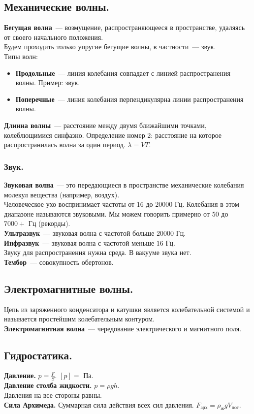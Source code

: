 \documentclass[12pt]{article}
\begin{document}
	\subsection{Механические волны.}
	\textbf{Бегущая волна}~--- возмущение, распространяющееся в пространстве, удаляясь от своего начального положения. \\
	Будем проходить только упругие бегущие волны, в частности~--- звук. \\
	Типы волн:
	\begin{itemize}
		\item \textbf{Продольные}~--- линия колебания совпадает с линией распространения волны. Пример: звук.
		\item \textbf{Поперечные}~--- линия колебания перпендикулярна линии распространения волны.
	\end{itemize}
	\textbf{Длинна волны}~--- расстояние между двумя ближайшими точками, колеблющимися синфазно. Определение номер $2$: расстояние на которое распространилась волна за один период. $\lambda = VT$.
	\subsubsection{Звук.}
	\textbf{Звуковая волна}~--- это передающиеся в пространстве механические колебания молекул вещества (например, воздух). \\
	Человеческое ухо воспринимает частоты от $16$ до $20000$ Гц. Колебания в этом диапазоне называются звуковыми. Мы можем говорить примерно от $50$ до $7000+$ Гц (рекорды). \\
	\textbf{Ультразвук}~--- звуковая волна с частотой больше $20000$ Гц. \\
	\textbf{Инфразвук}~--- звуковая волна с частотой меньше $16$ Гц. \\
	Звуку для распространения нужна среда. В вакууме звука нет. \\
	\textbf{Тембор}~--- совокупность обертонов.
	\subsection{Электромагнитные волны.}
	Цепь из заряженного конденсатора и катушки является колебательной системой и называется простейшим колебательным контуром. \\
	\textbf{Электромагнитная волна}~--- чередование электрического и магнитного поля.
	\subsection{Гидростатика.}
	\textbf{Давление.} $p = \frac{F}{S}$. $\left[p\right] =$ Па. \\
	\textbf{Давление столба жидкости.} $p = \rho g h$. \\
	Давления на все стороны равны. \\
	\textbf{Сила Архимеда.} Суммарная сила действия всех сил давления. $F_{\text{арх}} = \rho_{\text{ж}} g V_{\text{пог}}$.
\end{document}
